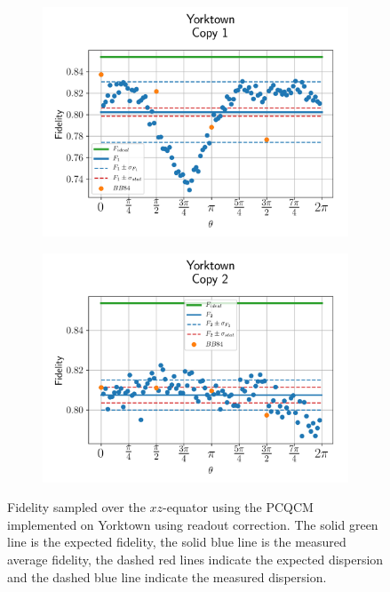   
  \begin{figure}[H]
    \centering
    \begin{subfigure}{.5\textwidth}
      \centering
      \includegraphics[width=\textwidth]{Figures/PhaseCovariant/IBM/OnlyEquator/results_ibmqx2_copy1.png}
      \label{fig:pc_uncorrected_yorktown_equator_1}
    \end{subfigure}%
    \begin{subfigure}{.5\textwidth}
      \centering
      \includegraphics[width=\textwidth]{Figures/PhaseCovariant/IBM/OnlyEquator/results_ibmqx2_copy2.png}
      \label{fig:pc_uncorrected_yorktown_equator_2}
    \end{subfigure}
    \vspace{-0.5cm}
    \caption{Fidelity sampled over the $xz$-equator using the PCQCM implemented on Yorktown using readout correction. The solid green line is the expected fidelity, the solid blue line is the measured average fidelity, the dashed red lines indicate the expected dispersion and the dashed blue line indicate the measured dispersion.}
    \label{fig:pc_uncorrected_yorktown_equator}
  \end{figure}



